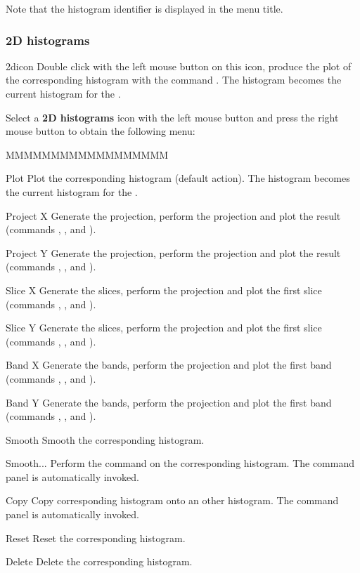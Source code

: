 Note that the histogram identifier is displayed in the menu title.


\subsubsection{2D histograms}
\begin{ICON}{2dicon}
Double click with the left mouse button on this icon, produce the plot of the
corresponding histogram with the command  . The histogram
becomes the current histogram for the \HSP.
\end{ICON}

Select a {\bf 2D histograms} icon with the left mouse button and press
the right mouse button to obtain the following menu:


\begin{DLsf}{MMMMMMMMMMMMMMMMMM}
\item[Plot]         Plot the corresponding histogram (default action). The
                    histogram becomes the current histogram for the \HSP.
\item[Project X]    Generate the  projection, perform the projection
                    and plot the result (commands , ,
                    and ).
\item[Project Y]    Generate the  projection, perform the projection
                    and plot the result (commands , ,
                    and ).
\item[Slice X]      Generate the  slices, perform the projection
                    and plot the first slice (commands ,
                    , and ).
\item[Slice Y]      Generate the  slices, perform the projection
                    and plot the first slice (commands ,
                    , and ).
\item[Band X]       Generate the  bands, perform the projection
                    and plot the first band (commands ,
                    , and ).
\item[Band Y]       Generate the  bands, perform the projection
                    and plot the first band (commands ,
                    , and ).
\item[Smooth]       Smooth the corresponding histogram.
\item[Smooth...]    Perform the command  on the corresponding
                    histogram. The command panel is automatically invoked.
\item[Copy ]        Copy corresponding histogram onto an other histogram.
                    The command panel is automatically invoked.
\item[Reset ]       Reset the corresponding histogram.
\item[Delete]       Delete the corresponding histogram.
\end{DLsf}

